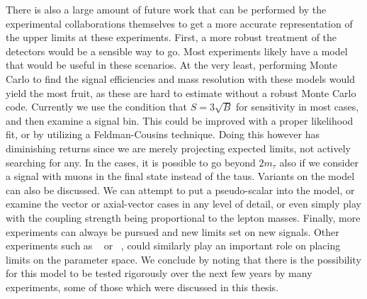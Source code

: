 There is also a large amount of future work that can be performed by the experimental collaborations themselves to get a more accurate representation of the upper limits at these experiments.
First, a more robust treatment of the detectors would be a sensible way to go.
Most experiments likely have a \geant model that would be useful in these scenarios.
At the very least, performing Monte Carlo to find the signal efficiencies and mass resolution with these models would yield the most fruit, as these are hard to estimate without a robust Monte Carlo code.
Currently we use the condition that $S = 3\sqrt{B}$ for sensitivity in most cases, and then examine a signal bin.
This could be improved with a proper likelihood fit, or by utilizing a Feldman-Cousins technique.
Doing this however has diminishing returns since we are merely projecting expected limits, not actively searching for any.
In the \belletwo cases, it is possible to go beyond $2m_\tau$ also if we consider a signal with muons in the final state instead of the taus.
Variants on the model can also be discussed.
We can attempt to put a pseudo-scalar into the model, or examine the vector or axial-vector cases in any level of detail, or even simply play with the coupling strength being proportional to the lepton masses.
Finally, more experiments can always be pursued and new limits set on new signals.
Other experiments such as \mutoe~\cite{Abrams:2012er} or \comet~\cite{Cui:2009zz}, could similarly play an important role on placing limits on the parameter space.
We conclude by noting that there is the possibility for this model to be tested rigorously over the next few years by many experiments, some of those which were discussed in this thesis.
